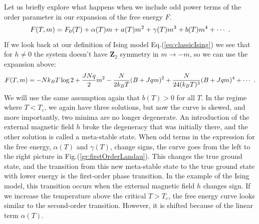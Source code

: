 \par
Let us briefly explore what happens when we include odd power terms of the order parameter in our expansion of the free energy $F$.
\begin{equation}
	F(T,m) = F_0(T) + \alpha(T)m + a(T)m^2 + \gamma(T)m^3 + b(T)m^4 + \cdots \ .
	\label{eq:landauexpansionodd}
\end{equation}
If we look back at our definition of Ising model Eq.(\ref{eq:classicIsing}) we see that for $h\neq 0$ the system doesn't have $\mathbf{Z}_2$ symmetry in $m \rightarrow -m$, so we can use the expansion above:
\begin{equation}
	F(T,m) = -Nk_BT\log 2 + \frac{JNq}{2}m^2 - \frac{N}{2k_BT}(B+Jqm)^2 + \frac{N}{24(k_BT)^3}(B + Jqm)^4 + \cdots \ .
\end{equation}
We will use the same assumption again that $b(T) > 0$ for all $T$. In the regime where $T<T_c$, we again have three solutions, but now the curve is skewed, and more importantly, two minima are no longer degenerate. An introduction of the external magnetic field $h$ broke the degeneracy that was initially there, and the other solution is called a meta-stable state. When odd terms in the expression for the free energy, $\alpha(T)$ and $\gamma(T)$, change signs, the curve goes from the left to the right picture in Fig.(\ref{gr:firstOrderLandau}). This changes the true ground state, and the transition from this new meta-stable state to the true ground state with lower energy is the first-order phase transition. In the example of the Ising model, this transition occurs when the external magnetic field $h$ changes sign. If we increase the temperature above the critical $T>T_c$, the free energy curve looks similar to the second-order transition. However, it is shifted because of the linear term $\alpha(T)$.
